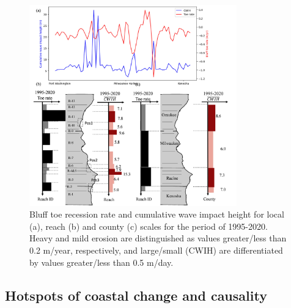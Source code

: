 \begin{figure}[htbp]
\centering
\includegraphics[width=0.8\textwidth]{chapter2/resources/figure2-7.jpg}
\caption{Bluff toe recession rate and cumulative wave impact height for local
(a), reach (b) and county (c) scales for the period of 1995-2020. Heavy and mild
erosion are distinguished as values greater/less than 0.2 m/year, respectively,
and large/small (CWIH) are differentiated by values greater/less than 0.5
m/day.} 
\label{fig:fig2.7} 
\end{figure}

\subsection{Hotspots of coastal change and causality} 
\label{Hotspots of coastal change and causality} 

